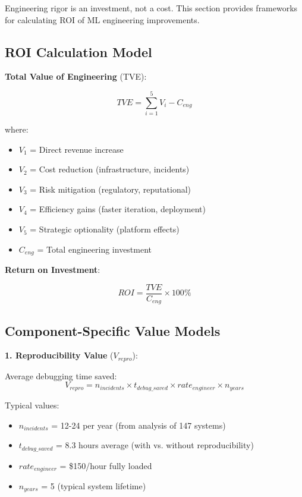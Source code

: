 Engineering rigor is an investment, not a cost. This section provides frameworks for calculating ROI of ML engineering improvements.

\subsection{ROI Calculation Model}

\textbf{Total Value of Engineering} (TVE):

\begin{equation}
TVE = \sum_{i=1}^{5} V_i - C_{eng}
\end{equation}

where:
\begin{itemize}
    \item $V_1$ = Direct revenue increase
    \item $V_2$ = Cost reduction (infrastructure, incidents)
    \item $V_3$ = Risk mitigation (regulatory, reputational)
    \item $V_4$ = Efficiency gains (faster iteration, deployment)
    \item $V_5$ = Strategic optionality (platform effects)
    \item $C_{eng}$ = Total engineering investment
\end{itemize}

\textbf{Return on Investment}:

\begin{equation}
ROI = \frac{TVE}{C_{eng}} \times 100\%
\end{equation}

\subsection{Component-Specific Value Models}

\textbf{1. Reproducibility Value} ($V_{repro}$):

Average debugging time saved:
\begin{equation}
V_{repro} = n_{incidents} \times t_{debug\_saved} \times rate_{engineer} \times n_{years}
\end{equation}

Typical values:
\begin{itemize}
    \item $n_{incidents}$ = 12-24 per year (from analysis of 147 systems)
    \item $t_{debug\_saved}$ = 8.3 hours average (with vs. without reproducibility)
    \item $rate_{engineer}$ = \$150/hour fully loaded
    \item $n_{years}$ = 5 (typical system lifetime)
\end{itemize}

